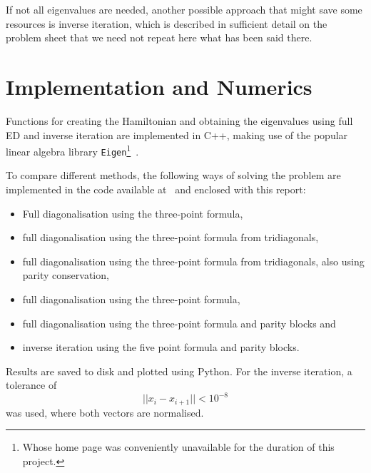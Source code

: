 \documentclass[a4paper,DIV=12,english]{scrartcl}
\begin{document}
If not all eigenvalues are needed, another possible approach that might save some resources is inverse iteration, which is described in sufficient detail on the problem sheet that we need not repeat here what has been said there.

\section{Implementation and Numerics}
Functions for creating the Hamiltonian and obtaining the eigenvalues using full ED and inverse iteration are implemented in C++, making use of the popular linear algebra library \texttt{Eigen}\footnote{Whose home page was conveniently unavailable for the duration of this project.}~\cite{eigenweb}.

To compare different methods, the following ways of solving the problem are implemented in the code available at~\cite{github} and enclosed with this report:
\begin{itemize}
    \item Full diagonalisation using the three-point formula,
    \item full diagonalisation using the three-point formula from tridiagonals,
    \item full diagonalisation using the three-point formula from tridiagonals, also using parity conservation,
    \item full diagonalisation using the three-point formula,
    \item full diagonalisation using the three-point formula and parity blocks and
    \item inverse iteration using the five point formula and parity blocks.
\end{itemize}
Results are saved to disk and plotted using Python. For the inverse iteration, a tolerance of
\begin{equation}
    ||x_i - x_{i+1}|| < 10^{-8}
\end{equation}
was used, where both vectors are normalised.
\end{document}

